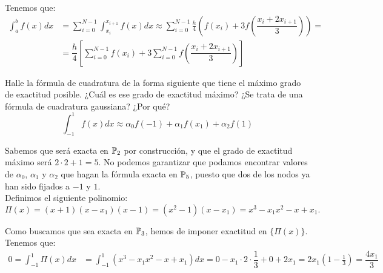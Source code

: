 \begin{ejercicio}
\begin{enumerate}
        Tenemos que:
        \begin{align*}
            \int_{a}^{b} f(x) dx &= \sum_{i=0}^{N-1}\int_{x_i}^{x_{i+1}} f(x) dx
            \approx \sum_{i=0}^{N-1}\frac{h}{4}\left(f(x_i) + 3f\left(\dfrac{x_i + 2x_{i+1}}{3}\right)\right)
            =\\&= \dfrac{h}{4}\left[\sum_{i=0}^{N-1} f(x_i) + 3\sum_{i=0}^{N-1} f\left(\dfrac{x_i + 2x_{i+1}}{3}\right)\right] 
        \end{align*}
    \end{enumerate}
\end{ejercicio}

\begin{ejercicio}\label{ej:2.1.27}
    Halle la fórmula de cuadratura de la forma siguiente que tiene el máximo grado de exactitud posible. ¿Cuál es ese grado de exactitud máximo? ¿Se trata de una fórmula de cuadratura gaussiana? ¿Por qué?
    $$\int_{-1}^{1} f(x) dx \approx \alpha_0 f(-1) + \alpha_1 f(x_1) + \alpha_2 f(1)$$

    Sabemos que será exacta en $\mathbb{P}_2$ por construcción, y que el grado de exactitud máximo será $2\cdot 2 + 1 = 5$. No podemos garantizar que podamos encontrar valores de $\alpha_0$, $\alpha_1$ y $\alpha_2$ que hagan la fórmula exacta en $\mathbb{P}_5$, puesto que dos de los nodos ya han sido fijados a $-1$ y $1$.\\

    Definimos el siguiente polinomio:
    \begin{equation*}
        \Pi(x) = (x+1)(x-x_1)(x-1) = (x^2-1)(x-x_1) = x^3 - x_1x^2 - x + x_1.
    \end{equation*}
    
    Como buscamos que sea exacta en $\mathbb{P}_3$, hemos de imponer exactitud en $\{\Pi(x)\}$. Tenemos que:
    \begin{align*}
        0 = \int_{-1}^{1} \Pi(x) dx &= \int_{-1}^{1} (x^3 - x_1x^2 - x + x_1) dx = 0 - x_1\cdot 2\cdot \dfrac{1}{3} + 0 + 2x_1 = 2x_1\left(1-\frac{1}{3}\right) = \dfrac{4x_1}{3}
    \end{align*}


\end{ejercicio}
